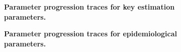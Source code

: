 \begin{figure}[ht]
    \caption{\textbf{Parameter progression traces for key estimation parameters.}}
\end{figure}

\begin{figure}[ht]
    \caption{\textbf{Parameter progression traces for epidemiological parameters.}}
\end{figure}

